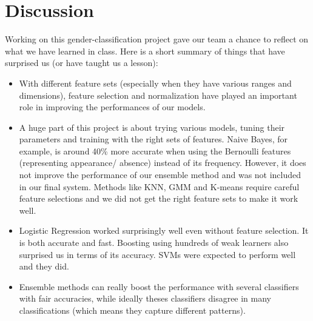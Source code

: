 \section{Discussion}
Working on this gender-classification project gave our team a chance to reflect on what we have learned in class. Here is a short summary of things that have surprised us (or have taught us a lesson):
\begin{itemize}
\item With different feature sets (especially when they have various ranges and dimensions), feature selection and normalization have played an important role in improving the performances of our models. 
\item A huge part of this project is about trying various models, tuning their parameters and training with the right sets of features. Naive Bayes, for example, is around 40\% more accurate when using the Bernoulli features (representing appearance/ absence) instead of its frequency. However, it does not improve the performance of our ensemble method and was not included in our final system. Methods like KNN, GMM and K-means require careful feature selections and we did not get the right feature sets to make it work well. 
\item Logistic Regression worked surprisingly well even without feature selection. It is both accurate and fast. Boosting using hundreds of weak learners also surprised us in terms of its accuracy. SVMs were expected to perform well and they did.
\item Ensemble methods can really boost the performance with several classifiers with fair accuracies, while ideally theses classifiers disagree in many classifications (which means they capture different patterns).
\end{itemize} 

